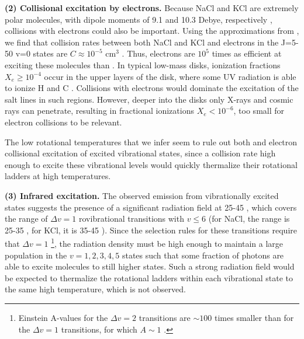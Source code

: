 \documentclass[twocolumn]{aastex62}
\begin{document}
\par{\textbf{(2) Collisional excitation by electrons.}} 
Because NaCl and KCl are extremely polar molecules, with dipole moments of 9.1
and 10.3 Debye, respectively \citep{Barton2014a}, collisions with electrons
could also be important.  Using the approximations from \citet{Dickinson1975a},
we find that collision rates between both NaCl and KCl and electrons in the
J=5-50 v=0 states are $C\approx10^{-5}$ cm$^{3}$ \pers.  Thus, electrons are
$10^5$ times as efficient at exciting these molecules than \hh. In typical
low-mass disks, ionization fractions $X_e \geq 10^{-4}$ occur in the upper
layers of the disk, where some UV radiation is able to ionize H and C
\citep{Bergin2007a}.  Collisions with electrons would dominate the excitation
of the salt lines in such regions.  However, deeper into the disks only X-rays
and cosmic rays can penetrate, resulting in fractional ionizations $X_e <
10^{-6}$, too small for electron collisions to be relevant. 

The low rotational temperatures that we infer seem to rule out both \hh and
electron collisional excitation of excited vibrational states, since a
collision rate high enough to excite these vibrational levels would quickly
thermalize their rotational ladders at high temperatures.


\par{\textbf{(3) Infrared excitation.}} 
The observed emission from vibrationally excited states suggests the
presence of a significant radiation field at 25-45 \um, which covers the range
of $\Delta v=1$ rovibrational transitions with $v\leq6$ (for NaCl, the range is
25-35 \um, for KCl, it is 35-45 \um).  Since the selection rules for these
transitions require that $\Delta v=1$ \footnote{Einstein A-values for the 
$\Delta v=2$ transitions are $\sim100$ times smaller than for the $\Delta v=1$
transitions, for which $A\sim1$ \pers.}, the radiation density must be high
enough to maintain a large population in the $v=1,
2, 3, 4, 5$ states such that some fraction of photons are able to excite
molecules to still higher states.  Such a strong radiation field would
be expected to thermalize the rotational ladders within each vibrational
state to the same high temperature, which is not observed.
\end{document}
